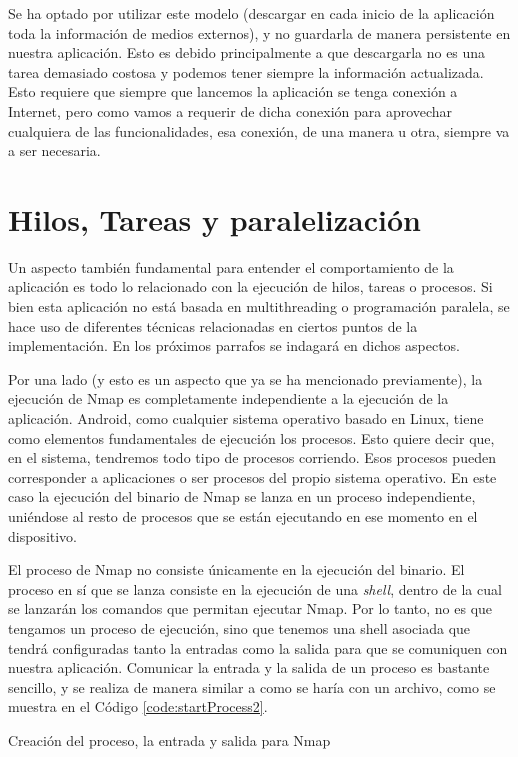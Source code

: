 Se ha optado por utilizar este modelo (descargar en cada inicio de la aplicación toda la información de medios externos), y no guardarla de manera persistente en nuestra aplicación. Esto es debido principalmente a que descargarla no es una tarea demasiado costosa y podemos tener siempre la información actualizada. Esto requiere que siempre que lancemos la aplicación se tenga conexión a Internet, pero como vamos a requerir de dicha conexión para aprovechar cualquiera de las funcionalidades, esa conexión, de una manera u otra, siempre va a ser necesaria.

\section{Hilos, Tareas y paralelización}

Un aspecto también fundamental para entender el comportamiento de la aplicación es todo lo relacionado con la ejecución de hilos, tareas o procesos. Si bien esta aplicación no está basada en multithreading o programación paralela, se hace uso de diferentes técnicas relacionadas en ciertos puntos de la implementación. En los próximos parrafos se indagará en dichos aspectos.

Por una lado (y esto es un aspecto que ya se ha mencionado previamente), la ejecución de Nmap es completamente independiente a la ejecución de la aplicación. Android, como cualquier sistema operativo basado en Linux, tiene como elementos fundamentales de ejecución los procesos. Esto quiere decir que, en el sistema, tendremos todo tipo de procesos corriendo. Esos procesos pueden corresponder a aplicaciones o ser procesos del propio sistema operativo. En este caso la ejecución del binario de Nmap se lanza en un proceso independiente, uniéndose al resto de procesos que se están ejecutando en ese momento en el dispositivo.

El proceso de Nmap no consiste únicamente en la ejecución del binario. El proceso en sí que se lanza consiste en la ejecución de una \textit{shell}, dentro de la cual se lanzarán los comandos que permitan ejecutar Nmap. Por lo tanto, no es que tengamos un proceso de ejecución, sino que tenemos una shell asociada que tendrá configuradas tanto la entradas como la salida para que se comuniquen con nuestra aplicación. Comunicar la entrada y la salida de un proceso es bastante sencillo, y se realiza de manera similar a como se haría con un archivo, como se muestra en el Código \ref{code:startProcess2}.

\begin{code}
	\caption{Creación del proceso, la entrada y salida para Nmap}
	\label{code:startProcess2}
	
\end{code}


